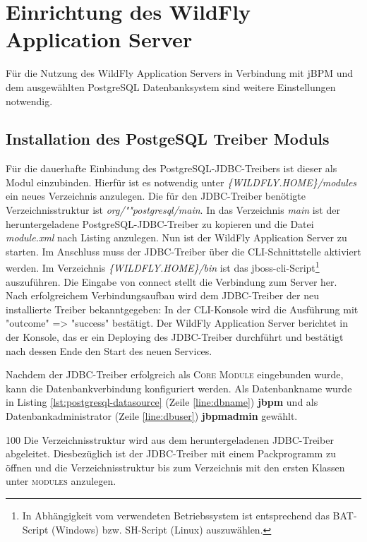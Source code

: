 \section{Einrichtung des WildFly Application Server}
Für die Nutzung des WildFly Application Servers in Verbindung mit jBPM und dem ausgewählten PostgreSQL Datenbanksystem sind weitere Einstellungen notwendig.

\subsection{Installation des PostgeSQL Treiber Moduls}
Für die dauerhafte Einbindung des PostgreSQL-JDBC-Treibers ist dieser als Modul einzubinden. Hierfür ist es notwendig unter \emph{\{WILDFLY.HOME\}/modules} ein neues Verzeichnis anzulegen. Die für den JDBC-Treiber benötigte Verzeichnisstruktur ist \emph{org/""postgresql/main}. In das Verzeichnis \emph{main} ist der heruntergeladene PostgreSQL-JDBC-Treiber zu kopieren und die Datei \emph{module.xml} nach Listing  anzulegen. Nun ist der WildFly Application Server zu starten.
Im Anschluss muss der JDBC-Treiber über die CLI-Schnittstelle aktiviert werden. Im Verzeichnis \emph{\{WILDFLY.HOME\}/bin} ist das jboss-cli-Script\footnote{In Abhängigkeit vom verwendeten Betriebssystem ist entsprechend das BAT-Script (Windows) bzw. SH-Script (Linux) auszuwählen.} auszuführen.
Die Eingabe von {\ttfamily connect} stellt die Verbindung zum Server her. Nach erfolgreichem Verbindungsaufbau wird dem JDBC-Treiber der neu installierte Treiber bekanntgegeben: 
In der CLI-Konsole wird die Ausführung mit {\ttfamily "{}outcome"{} => "{}success"{}} bestätigt. Der WildFly Application Server berichtet in der Konsole, das er ein {\ttfamily Deploying} des JDBC-Treiber durchführt und bestätigt nach dessen Ende den Start des neuen Services.

Nachdem der JDBC-Treiber erfolgreich als \textsc{Core Module} eingebunden wurde, kann die Datenbankverbindung konfiguriert werden.
Als Datenbankname wurde in Listing \ref{lst:postgresql-datasource} (Zeile \ref{line:dbname}) \textbf{jbpm} und als Datenbankadministrator (Zeile \ref{line:dbuser}) \textbf{jbpmadmin} gewählt.
\begin{info}{100}
	Die Verzeichnisstruktur wird aus dem heruntergeladenen JDBC-Treiber abgeleitet. Diesbezüglich ist der JDBC-Treiber mit einem Packprogramm zu öffnen und die Verzeichnisstruktur bis zum Verzeichnis mit den ersten Klassen unter \textsc{modules} anzulegen.
\end{info}